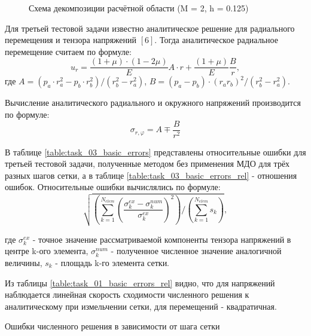 \documentclass[a4paper, 14pt]{extarticle}
\newcommand{\area}{rectangle}
\newcommand{\task}{3_fixes}
\newcommand{\taskNum}{01}
\begin{document}
\begin{figure}[h]
\caption{Схема декомпозиции расчётной области (M = 2, h = 0.125)}
\label{fig:task_\taskNum_decomposition}
\end{figure}

\newpage

Для третьей тестовой задачи известно аналитическое решение для радиального перемещения и тензора напряжений $\left[6\right]$. Тогда аналитическое радиальное перемещение считаем по формуле:
\begin{equation*}
u_r = \frac{(1 + \mu) \cdot (1 - 2\mu)}{E}A \cdot r + \frac{(1 + \mu)}{E} \frac{B}{r},
\end{equation*}
где $A = (p_a \cdot r_a^2 - p_b \cdot r_b^2) / (r_b^2 - r_a^2)$, $B = (p_a - p_b) \cdot (r_a r_b)^2 / (r_b^2 - r_a^2)$.

Вычисление аналитического радиального и окружного напряжений производится по формуле:
\begin{equation*}
\sigma_{r, \varphi} = A \mp \frac{B}{r^2}
\end{equation*}

В таблице \ref{table:task_03_basic_errors} представлены относительные ошибки для третьей тестовой задачи, полученные методом без применения МДО для трёх разных шагов сетки, а в таблице \ref{table:task_03_basic_errors_rel} - отношения ошибок. Относительные ошибки вычислялись по формуле:
\begin{equation*}
\sqrt{\left(\sum_{k = 1}^{N_{elem}} {\left(\frac{\sigma_k^{ex} - \sigma_k^{num}}{\sigma_k^{ex}}\right)^2}\right) / \left(\sum_{k=1}^{N_{elem}} {s_k}\right)},
\end{equation*}

где $\sigma_k^{ex}$ - точное значение рассматриваемой компоненты тензора напряжений в центре k-ого элемента, $\sigma_k^{num}$ - полученное численное значение аналогичной величины, $s_k$ - площадь k-го элемента сетки. 

\newpage

Из таблицы \ref{table:task_\taskNum_basic_errors_rel} видно, что для напряжений наблюдается линейная скорость сходимости численного решения к аналитическому при измельчении сетки, для перемещений - квадратичная.
\begin{table}[h]
\caption{Ошибки численного решения в зависимости от шага сетки}
\label{table:task_\taskNum_basic_errors}
\end{table}
\end{document}
